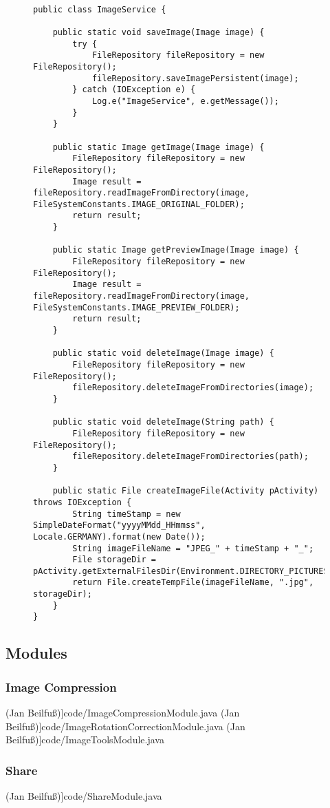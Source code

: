 \begin{figure}[H]
\begin{lstlisting}[caption=ImageService (Ruthild Gilles)]

public class ImageService {

    public static void saveImage(Image image) {
        try {
            FileRepository fileRepository = new FileRepository();
            fileRepository.saveImagePersistent(image);
        } catch (IOException e) {
            Log.e("ImageService", e.getMessage());
        }
    }

    public static Image getImage(Image image) {
        FileRepository fileRepository = new FileRepository();
        Image result = fileRepository.readImageFromDirectory(image, FileSystemConstants.IMAGE_ORIGINAL_FOLDER);
        return result;
    }

    public static Image getPreviewImage(Image image) {
        FileRepository fileRepository = new FileRepository();
        Image result = fileRepository.readImageFromDirectory(image, FileSystemConstants.IMAGE_PREVIEW_FOLDER);
        return result;
    }

    public static void deleteImage(Image image) {
        FileRepository fileRepository = new FileRepository();
        fileRepository.deleteImageFromDirectories(image);
    }

    public static void deleteImage(String path) {
        FileRepository fileRepository = new FileRepository();
        fileRepository.deleteImageFromDirectories(path);
    }

    public static File createImageFile(Activity pActivity) throws IOException {
        String timeStamp = new SimpleDateFormat("yyyyMMdd_HHmmss", Locale.GERMANY).format(new Date());
        String imageFileName = "JPEG_" + timeStamp + "_";
        File storageDir = pActivity.getExternalFilesDir(Environment.DIRECTORY_PICTURES);
        return File.createTempFile(imageFileName, ".jpg", storageDir);
    }
}
\end{lstlisting}
\end{figure}

\subsection{Modules}
	\subsubsection{Image Compression}
 (Jan Beilfuß)]{code/ImageCompressionModule.java}
 (Jan Beilfuß)]{code/ImageRotationCorrectionModule.java}
 (Jan Beilfuß)]{code/ImageToolsModule.java}
	\subsubsection{Share}
 (Jan Beilfuß)]{code/ShareModule.java}


